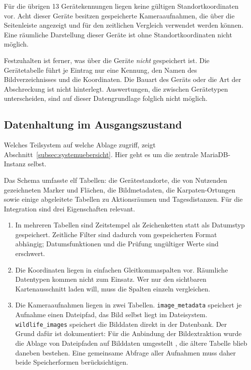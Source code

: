 \documentclass[12pt,a4paper]{report}
\begin{document}
Für die übrigen 13 Gerätekennungen liegen keine
gültigen Standortkoordinaten vor. Acht dieser
Geräte besitzen gespeicherte Kameraaufnahmen,
die über die Seitenleiste angezeigt und für
den zeitlichen Vergleich verwendet werden können.
Eine räumliche Darstellung dieser Geräte ist
ohne Standortkoordinaten nicht möglich.


Festzuhalten ist ferner, was über die Geräte \emph{nicht} gespeichert ist. Die Gerätetabelle
führt je Eintrag nur eine Kennung, den Namen des Bildverzeichnisses und die Koordinaten.
Die Bauart des Geräts oder die Art der Abschreckung ist nicht hinterlegt. Auswertungen, die
zwischen Gerätetypen unterscheiden, sind auf dieser Datengrundlage folglich nicht möglich.

\subsection{Datenhaltung im Ausgangszustand}
\label{subsec:datenhaltung}

Welches Teilsystem auf welche Ablage zugriff, zeigt Abschnitt~\ref{subsec:systemuebersicht}.
Hier geht es um die zentrale MariaDB-Instanz selbst.

Das Schema umfasste elf Tabellen: die Gerätestandorte, die von Nutzenden gezeichneten Marker
und Flächen, die Bildmetadaten, die Karpaten-Ortungen sowie einige abgeleitete Tabellen zu
Aktionsräumen und Tagesdistanzen. Für die Integration sind drei Eigenschaften relevant.

\begin{enumerate}
    \item In mehreren Tabellen sind Zeitstempel als
    Zeichenketten statt als Datumstyp gespeichert.
    Zeitliche Filter sind dadurch vom gespeicherten
    Format abhängig; Datumsfunktionen und die Prüfung
    ungültiger Werte sind erschwert.

    \item Die Koordinaten liegen in einfachen
    Gleitkommaspalten vor. Räumliche Datentypen kommen
    nicht zum Einsatz. Wer nur den sichtbaren
    Kartenausschnitt laden will, muss die Spalten
    einzeln vergleichen.

    \item Die Kameraaufnahmen liegen in zwei Tabellen.
    \texttt{image\_metadata} speichert je Aufnahme
    einen Dateipfad, das Bild selbst liegt im
    Dateisystem. \texttt{wildlife\_images} speichert
    die Bilddaten direkt in der Datenbank. Der Grund
    dafür ist dokumentiert: Für die Anbindung der
    Bildextraktion wurde die Ablage von Dateipfaden
    auf Bilddaten umgestellt \cite[S.~21]{LelchatBA},
    die ältere Tabelle blieb daneben bestehen. Eine
    gemeinsame Abfrage aller Aufnahmen muss daher
    beide Speicherformen berücksichtigen.
\end{enumerate}
\end{document}

